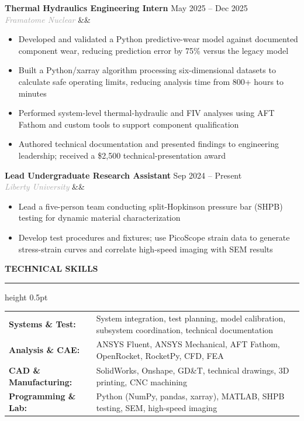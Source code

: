 \documentclass[10pt,letterpaper]{article}
\renewcommand{\section}[1]{
    \vspace{5pt}
    {\normalsize\bfseries\textcolor{navyblue}{\MakeUppercase{#1}}}
    \vspace{0pt}
    
    {\color{navyblue}\hrule height 0.5pt}
    \vspace{3pt}
}
\newcommand{\resumeEntry}[4]{
    \textbf{#1} \hfill \textcolor{medgray}{#2} \\
    \textit{\textcolor{darkgray}{#3}} \ifx&#4&\else\hfill \textcolor{medgray}{#4}\fi
    \vspace{0pt}
}
\begin{document}
\resumeEntry{Thermal Hydraulics Engineering Intern}{May 2025 -- Dec 2025}{Framatome Nuclear}{}
\begin{itemize}
    \item Developed and validated a Python predictive-wear model against documented component wear, reducing prediction error by 75\% versus the legacy model
    \item Built a Python/xarray algorithm processing six-dimensional datasets to calculate safe operating limits, reducing analysis time from 800+ hours to minutes
    \item Performed system-level thermal-hydraulic and FIV analyses using AFT Fathom and custom tools to support component qualification
    \item Authored technical documentation and presented findings to engineering leadership; received a \$2,500 technical-presentation award
\end{itemize}

\vspace{1pt}

\resumeEntry{Lead Undergraduate Research Assistant}{Sep 2024 -- Present}{Liberty University}{}
\begin{itemize}
    \item Lead a five-person team conducting split-Hopkinson pressure bar (SHPB) testing for dynamic material characterization
    \item Develop test procedures and fixtures; use PicoScope strain data to generate stress-strain curves and correlate high-speed imaging with SEM results
\end{itemize}

\vspace{1pt}

\section{Technical Skills}

\begin{tabularx}{\textwidth}{@{}>{}l X@{}}
\textbf{Systems \& Test:} & System integration, test planning, model calibration, subsystem coordination, technical documentation \\[2pt]
\textbf{Analysis \& CAE:} & ANSYS Fluent, ANSYS Mechanical, AFT Fathom, OpenRocket, RocketPy, CFD, FEA \\[2pt]
\textbf{CAD \& Manufacturing:} & SolidWorks, Onshape, GD\&T, technical drawings, 3D printing, CNC machining \\[2pt]
\textbf{Programming \& Lab:} & Python (NumPy, pandas, xarray), MATLAB, SHPB testing, SEM, high-speed imaging \\
\end{tabularx}
\end{document}
